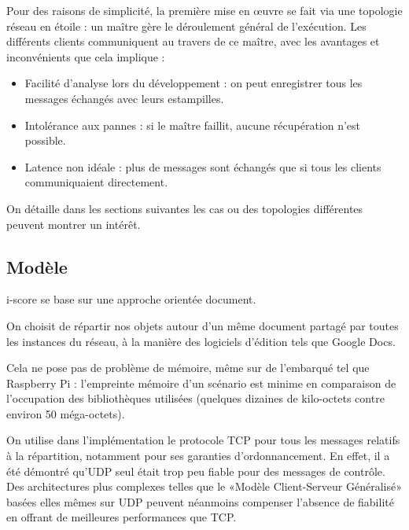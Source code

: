 \documentclass{article}
\begin{document}
Pour des raisons de simplicité, la première mise en œuvre se fait via une topologie réseau en étoile : un maître gère le déroulement général de l'exécution. 
Les différents clients communiquent au travers de ce maître, avec les avantages et inconvénients que cela implique : 
\begin{itemize}
    \item Facilité d'analyse lors du développement : on peut enregistrer tous les messages échangés avec leurs estampilles.
    \item Intolérance aux pannes : si le maître faillit, aucune récupération n'est possible.
    \item Latence non idéale : plus de messages sont échangés que si tous les clients communiquaient directement.
\end{itemize}

On détaille dans les sections suivantes les cas ou des topologies différentes peuvent montrer un intérêt.



\subsection{Modèle}
i-score se base sur une approche orientée document.

On choisit de répartir nos objets autour d'un même document partagé par toutes les instances du réseau, 
à la manière des logiciels d'édition tels que Google Docs. %

Cela ne pose pas de problème de mémoire, même sur de l'embarqué tel que Raspberry Pi : l'empreinte mémoire d'un scénario est minime en comparaison de l'occupation des bibliothèques utilisées (quelques dizaines de kilo-octets contre environ 50 méga-octets).

On utilise dans l'implémentation le protocole TCP pour tous les messages relatifs à la répartition, notamment pour ses garanties d'ordonnancement.
En effet, il a été démontré qu'UDP seul était trop peu fiable pour des messages de contrôle. 
Des architectures plus complexes telles que le «Modèle Client-Serveur Généralisé» basées elles mêmes sur UDP peuvent néanmoins compenser l'absence de fiabilité\cite{mckinney2012oscthulhu} en offrant de meilleures performances que TCP.
\end{document}
